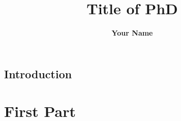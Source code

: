 \documentclass[english,BCOR=5mm,DIV=12,fontsize=10pt]{book}
\title{Title of PhD}
\author{\textbf{Your Name}}
\begin{document}
\maketitle

\thispagestyle{empty}














\tableofcontents

\clearpage

\justifying



\chapter{Introduction}
\label{ch:introduction}
    
 

\part{First Part}
\label{part:first}
\end{document}
